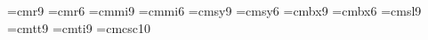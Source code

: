  
\ifx\tenpoint\undefined\let\loadedfrommacro=Y
         
         \let\loadedfrommacro=N\fi
 
\font\ninerm=cmr9            \font\sixrm=cmr6
\font\ninei=cmmi9            \font\sixi=cmmi6
\font\ninesy=cmsy9           \font\sixsy=cmsy6
\font\ninebf=cmbx9           \font\sixbf=cmbx6
\font\ninesl=cmsl9           \font\ninett=cmtt9      \font\nineit=cmti9
\font\ninecsc=cmcsc10
 
\ifx\ninepoint\undefined
   \def\ninepoint{\def\rm{\fam0\ninerm} %
       \textfont0=\ninerm  \scriptfont0=\sixrm  \scriptscriptfont0=\fiverm
       \textfont1=\ninei   \scriptfont1=\sixi   \scriptscriptfont1=\fivei
       \textfont2=\ninesy  \scriptfont2=\sixsy  \scriptscriptfont2=\fivesy
       \textfont3=\tenex   \scriptfont3=\tenex  \scriptscriptfont3=\tenex
       \textfont\itfam=\nineit   \def\it{\fam\itfam\nineit}%
       \textfont\slfam=\ninesl   \def\sl{\fam\slfam\ninesl}%
       \textfont\ttfam=\ninett   \def\tt{\fam\ttfam\ninett}%
       \textfont\bffam=\ninebf   \scriptfont\bffam=\sixbf
        \scriptscriptfont\bffam=\fivebf   \def\bf{\fam\bffam\ninebf}%
       \textfont\scfam=\ninecsc  \def\sc{\fam\scfam\ninecsc}%
       \normalbaselineskip=11pt
       \setbox\strutbox=\hbox{\vrule height8pt depth3pt width0pt}%
       \normalbaselines\rm}
   \fi
